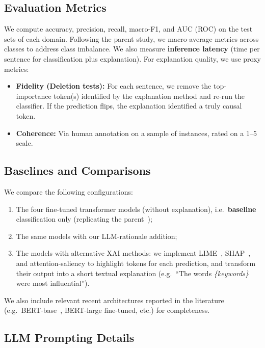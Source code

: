 \subsection{Evaluation Metrics}\label{subsec:evaluation_metrics}

We compute accuracy, precision, recall, macro-F1, and AUC (ROC) on the test sets of each domain. Following the parent study, we macro-average metrics across classes to address class imbalance. We also measure \textbf{inference latency} (time per sentence for classification plus explanation). For explanation quality, we use proxy metrics:

\begin{itemize}[leftmargin=*]
    \item \textbf{Fidelity (Deletion tests):} For each sentence, we remove the top-importance token(s) identified by the explanation method and re-run the classifier. If the prediction flips, the explanation identified a truly causal token.
    \item \textbf{Coherence:} Via human annotation on a sample of instances, rated on a 1--5 scale.
\end{itemize}

\subsection{Baselines and Comparisons}\label{subsec:baselines}

We compare the following configurations:
\begin{enumerate}[label=(\arabic*)]
    \item The four fine-tuned transformer models (without explanation), i.e.\ \textbf{baseline} classification only (replicating the parent~\cite{oprea2025llm});
    \item The same models with our LLM-rationale addition;
    \item The models with alternative XAI methods: we implement LIME~\cite{ribeiro2016why}, SHAP~\cite{lundberg2017unified}, and attention-saliency to highlight tokens for each prediction, and transform their output into a short textual explanation (e.g.\ ``The words \emph{\{keywords\}} were most influential'').
\end{enumerate}

We also include relevant recent architectures reported in the literature (e.g.\ BERT-base~\cite{devlin2019bert}, BERT-large fine-tuned, etc.) for completeness.

\subsection{LLM Prompting Details}\label{subsec:llm_prompting}

